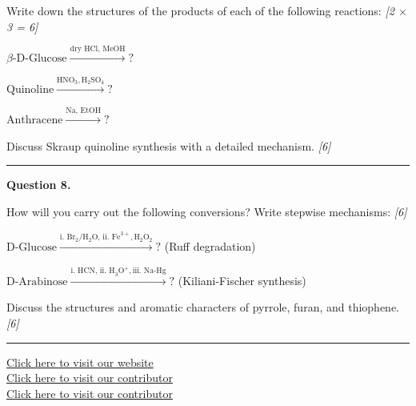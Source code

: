 \documentclass[11pt,a4paper]{article}
\newcommand{\pts}[1]{\hfill   \textit{[#1]}}
\begin{document}
\begin{parts}
  \item Write down the structures of the products of each of the following reactions: \pts{2 $ \times$ 3 = 6}
  
\begin{parts}
    \item $\beta \text{-D-Glucose} \xrightarrow{ \text{dry HCl, MeOH}} ?$
    \item $ \text{Quinoline} \xrightarrow{ \text{HNO}_3,  \text{H}_2 \text{SO}_4} ?$
    \item $ \text{Anthracene} \xrightarrow{ \text{Na, EtOH}} ?$
  \end{parts}
  \item Discuss Skraup quinoline synthesis with a detailed mechanism. \pts{6}
\end{parts}

\medskip\rule{\linewidth}{0.2pt}




\noindent   \textbf{Question 8.}

\begin{parts}
  \item How will you carry out the following conversions? Write stepwise mechanisms: \pts{6}
  
\begin{parts}
    \item $ \text{D-Glucose} \xrightarrow{ \text{i. Br}_2/ \text{H}_2 \text{O, ii. Fe}^{3+},  \text{H}_2 \text{O}_2} ?$ (Ruff degradation)
    \item $ \text{D-Arabinose} \xrightarrow{ \text{i. HCN, ii. H}_3 \text{O}^+,  \text{iii. Na-Hg}} ?$ (Kiliani-Fischer synthesis)
  \end{parts}
  \item Discuss the structures and aromatic characters of pyrrole, furan, and thiophene. \pts{6}
\end{parts}

\vfill
\rule{\linewidth}{0.4pt}

\begin{center}\small
  \href{https://bhu-exam.vercel.app/}{Click here to visit our website}\\[4pt]
  \href{https://me-aryan.vercel.app/}{Click here to visit our contributor}\\[4pt]
  \href{https://quashan-me.vercel.app/}{Click here to visit our contributor}
\end{center}
\end{document}
